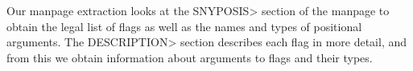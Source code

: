 Our manpage extraction looks at the \<SNYPOSIS> section of the manpage to obtain
the legal list of flags as well as the names and types of positional arguments.
The \<DESCRIPTION> section describes each flag in more detail, and from this we
obtain information about arguments to flags and their types.
